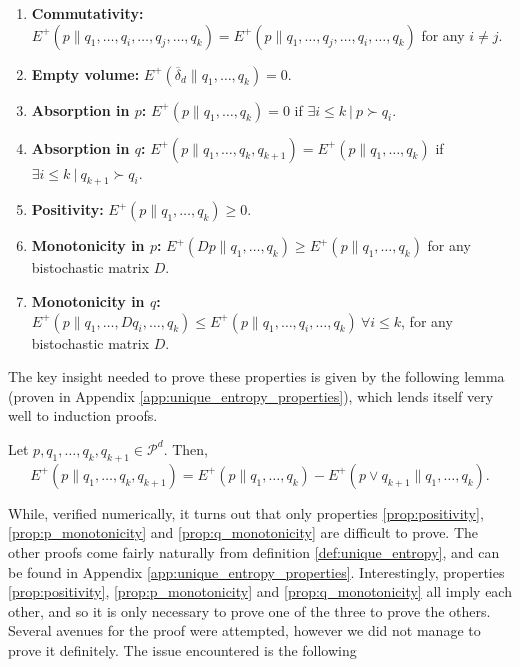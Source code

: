 \begin{enumerate}
    \item \textbf{Commutativity:} $E^+(p \parallel q_1, \dots, q_i, \dots, q_j, \dots, q_k) = E^+(p \parallel q_1, \dots, q_j, \dots, q_i, \dots, q_k)$ for any $i \neq j$. \label{prop:commutativity}
    \item \textbf{Empty volume:} $E^+(\overline{\delta}_d \parallel q_1, \dots, q_k) = 0$. \label{prop:empty}
    \item \textbf{Absorption in $p$:} $E^+(p \parallel q_1, \dots, q_k) = 0$ if $\exists i \leq k \: | \: p \succ q_i$. \label{prop:p_absorption}
    \item \textbf{Absorption in $q$:} $E^+(p \parallel q_1, \dots, q_k, q_{k+1}) = E^+(p \parallel q_1, \dots, q_k)$ if $\exists i \leq k \: | \: q_{k+1} \succ q_i$. \label{prop:q_absorption}
    \item \textbf{Positivity:} $E^+(p \parallel q_1, \dots, q_k) \geq 0$. \label{prop:positivity}
    \item \textbf{Monotonicity in $p$:} $E^+(Dp \parallel q_1, \dots, q_k) \geq E^+(p \parallel q_1, \dots, q_k)$ for any bistochastic matrix $D$. \label{prop:p_monotonicity}
    \item \textbf{Monotonicity in $q$:} $E^+(p \parallel q_1, \dots, Dq_i, \dots, q_k) \leq E^+(p \parallel q_1, \dots, q_i, \dots, q_k) \: \forall i \leq k$,  for any bistochastic matrix $D$. \label{prop:q_monotonicity}
\end{enumerate}

\noindent The key insight needed to prove these properties is given by the following lemma (proven in Appendix \ref{app:unique_entropy_properties}), which lends itself very well to induction proofs.

\begin{lemma} \label{lem:induction_trick}
    Let $p, q_1, \dots, q_k, q_{k+1} \in \mathcal{P}^d$. Then,
    \begin{equation}
        E^+(p \parallel q_1, \dots, q_k, q_{k+1}) = E^+(p \parallel q_1, \dots, q_k) - E^+(p \vee q_{k+1} \parallel q_1, \dots, q_k).
    \end{equation}
\end{lemma}

While, verified numerically, it turns out that only properties \ref{prop:positivity}, \ref{prop:p_monotonicity} and \ref{prop:q_monotonicity} are difficult to prove. The other proofs come fairly naturally from definition \ref{def:unique_entropy}, and can be found in Appendix \ref{app:unique_entropy_properties}. Interestingly, properties \ref{prop:positivity}, \ref{prop:p_monotonicity} and \ref{prop:q_monotonicity} all imply each other, and so it is only necessary to prove one of the three to prove the others. Several avenues for the proof were attempted, however we did not manage to prove it definitely. The issue encountered is the following



